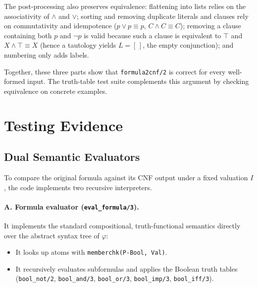 \documentclass[11pt]{article}
\begin{document}
The post-processing also preserves equivalence: flattening into lists relies on
the associativity of $\land$ and $\lor$; sorting and removing duplicate literals
and clauses rely on commutativity and idempotence ($p \lor p \equiv p$,
$C \land C \equiv C$); removing a clause containing both $p$ and $\neg p$ is
valid because such a clause is equivalent to $\top$ and $X \land \top \equiv X$
(hence a tautology yields $L = [\,]$, the empty conjunction); and numbering only
adds labels.

Together, these three parts show that \texttt{formula2cnf/2} is correct for every
well-formed input. The truth-table test suite complements this argument by
checking equivalence on concrete examples.

\section{Testing Evidence}
\subsection{Dual Semantic Evaluators}

To compare the original formula against its CNF output under a fixed valuation
$I$, the code implements two recursive interpreters.

\paragraph{A. Formula evaluator (\texttt{eval\_formula/3}).}
It implements the standard compositional, truth-functional semantics directly
over the abstract syntax tree of $\varphi$:
\begin{itemize}
    \item It looks up atoms with \texttt{memberchk(P-Bool, Val)}.
    \item It recursively evaluates subformulas and applies the Boolean truth
          tables (\texttt{bool\_not/2}, \texttt{bool\_and/3}, \texttt{bool\_or/3},
          \texttt{bool\_imp/3}, \texttt{bool\_iff/3}).
\end{itemize}
\end{document}
